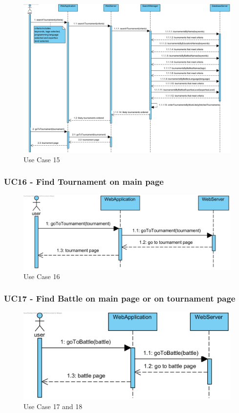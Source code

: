 \documentclass{article}
\begin{document}
\begin{figure}[H]
    \centering
    \includegraphics[width=1\textwidth]{images/UseCaseSequenceDiagrams/UC15}
    \caption{Use Case 15}
    \label{fig:UC15}
\end{figure}

\subsubsection*{UC16 - Find Tournament on main page}

\begin{figure}[H]
    \centering
    \includegraphics[width=1\textwidth]{images/UseCaseSequenceDiagrams/UC16}
    \caption{Use Case 16}
    \label{fig:UC16}
\end{figure}

\subsubsection*{UC17 - Find Battle on main page or on tournament page}

\begin{figure}[H]
    \centering
    \includegraphics[width=1\textwidth]{images/UseCaseSequenceDiagrams/UC17&18}
    \caption{Use Case 17 and 18}
    \label{fig:UC17and18}
\end{figure}
\end{document}
